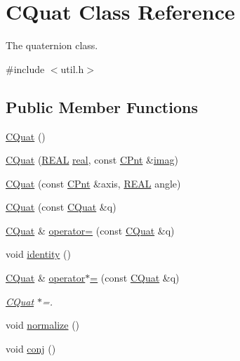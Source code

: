 \hypertarget{classCQuat}{\section{C\-Quat Class Reference}
\label{classCQuat}
}


The quaternion class.  




{\ttfamily \#include $<$util.\-h$>$}

\subsection*{Public Member Functions}
\begin{DoxyCompactItemize}
\item 
\hyperlink{classCQuat_aa8497e624cd8c83814ee708beed80be8}{C\-Quat} ()
\item 
\hyperlink{classCQuat_a9e2eb21a9c7ec78d94e0fe38e34b242b}{C\-Quat} (\hyperlink{util_8h_a5821460e95a0800cf9f24c38915cbbde}{R\-E\-A\-L} \hyperlink{classCQuat_a7f18efa604d788a39bb6726de6546ce2}{real}, const \hyperlink{classCPnt}{C\-Pnt} \&\hyperlink{classCQuat_a783b34fbc307fbb00fd112c8441b0f30}{imag})
\item 
\hyperlink{classCQuat_a5225432b6d2298207cadd596073a500c}{C\-Quat} (const \hyperlink{classCPnt}{C\-Pnt} \&axis, \hyperlink{util_8h_a5821460e95a0800cf9f24c38915cbbde}{R\-E\-A\-L} angle)
\item 
\hyperlink{classCQuat_acd11b75e7090f6a6992425bcc5416219}{C\-Quat} (const \hyperlink{classCQuat}{C\-Quat} \&q)
\item 
\hyperlink{classCQuat}{C\-Quat} \& \hyperlink{classCQuat_ad7a24172721a059adcbf40f6db7584fb}{operator=} (const \hyperlink{classCQuat}{C\-Quat} \&q)
\item 
void \hyperlink{classCQuat_a9a0a307a7660ba46e1587b67f5cc35ea}{identity} ()
\item 
\hyperlink{classCQuat}{C\-Quat} \& \hyperlink{classCQuat_a91a9f75dd706a025a68121522d30a561}{operator$\ast$=} (const \hyperlink{classCQuat}{C\-Quat} \&q)
\begin{DoxyCompactList}\small\item\em \hyperlink{classCQuat}{C\-Quat} $\ast$=. \end{DoxyCompactList}\item 
void \hyperlink{classCQuat_ab6e67daab741dfb157e3e5562a804706}{normalize} ()
\item 
void \hyperlink{classCQuat_a03c7815f439647be9e4cc8f3937cd0d0}{conj} ()
\item 

\end{DoxyCompactItemize}
